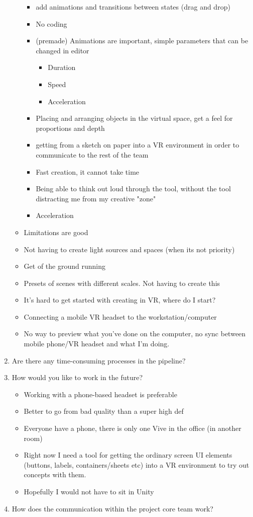 \begin{enumerate}
\begin{itemize}
\begin{itemize}
  \item add animations and transitions between states (drag and drop)
  \item No coding
  \item (premade) Animations are important, simple parameters that can be changed in editor
  \begin{itemize}
    \item Duration
    \item Speed
    \item Acceleration
  \end{itemize}
  \item Placing and arranging objects in the virtual space, get a feel for proportions and depth
  \item getting from a sketch on paper into a VR environment in order to communicate to the rest of the team
  \item Fast creation, it cannot take time
  \item Being able to think out loud through the tool, without the tool distracting me from my creative "zone"
  \item Acceleration
\end{itemize}
\item Limitations are good
\item Not having to create light sources and spaces (when its not priority)
\item Get of the ground running
\item Presets of scenes with different scales. Not having to create this
\item It's hard to get started with creating in VR, where do I start?
\item Connecting a mobile VR headset to the workstation/computer
\item No way to preview what you've done on the computer, no sync between mobile phone/VR headset and what I'm doing.

\end{itemize}
\item Are there any time-consuming processes in the pipeline?

\item How would you like to work in the future?
\begin{itemize}
\item Working with a phone-based headset is preferable
\item Better to go from bad quality than a super high def
\item Everyone have a phone, there is only one Vive in the office (in another room)
\item Right now I need a tool for getting the ordinary screen UI elements (buttons, labels, containers/sheets etc) into a VR environment to try out concepts with them.
\item Hopefully I would not have to sit in Unity
\end{itemize}
\item How does the communication within the project core team work?


\end{enumerate}
